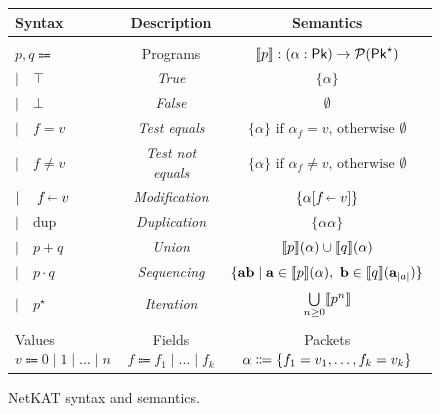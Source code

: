 \documentclass[acmsmall,dvipsnames,nonacm]{acmart}
\begin{document}
\begin{figure}
    \renewcommand{\arraystretch}{1.1}
    \begin{tabular}{lcc}
        \textbf{Syntax} & \textbf{Description} & \textbf{Semantics} \\[1mm]
        \hline \\[-0.9em]
        $p,q \Coloneqq $ & Programs & $\llbracket p \rrbracket : (\alpha : \mathsf{Pk}) \to \mathcal{P}(\mathsf{Pk}^\star)$ \\
        \qquad$\mid\quad \top$ & \emph{True} & $\{ \alpha \}$ \\
        \qquad$\mid\quad \bot$ & \emph{False} & $\emptyset$ \\
        \qquad$\mid\quad f = v$ & \emph{Test equals} & $\{ \alpha \} \text{ if } \alpha_f = v \text{, otherwise } \emptyset$ \\
        \qquad$\mid\quad f \neq v$ & \emph{Test not equals} & $\{ \alpha \} \text{ if } \alpha_f \neq v \text{, otherwise } \emptyset$ \\
        \qquad$\mid\quad f \mathrel{\!\shortleftarrow\!}\, v$ & \emph{Modification} & $\{ \alpha[f \mathrel{\!\shortleftarrow\!}\, v] \}$ \\
        \qquad$\mid\quad \text{dup}$ & \emph{Duplication} & $\{ \alpha\alpha \}$ \\
        \qquad$\mid\quad p + q$ & \emph{Union} & $\llbracket p \rrbracket(\alpha) \cup \llbracket q \rrbracket(\alpha)$ \\
        \qquad$\mid\quad p \cdot q$ & \emph{Sequencing} & $\{ \mathbf{a}\mathbf{b} \mid \mathbf{a} \in \llbracket p \rrbracket(\alpha),\ \mathbf{b} \in \llbracket q \rrbracket(\mathbf{a}_{|a|}) \}$ \\
        \qquad$\mid\quad p^\star$ & \emph{Iteration} & $\bigcup\limits_{n\geq 0} \llbracket p^n \rrbracket$ \\[3mm]
        \hline \\[-0.8em]
        {Values} $v \Coloneqq 0 \mid 1 \mid \ldots \mid n$ &
        {Fields} $f \Coloneqq f_1 \mid \ldots \mid f_k$ &
        {Packets} $\alpha \Coloneqq \{f_1 = v_1, \ldots, f_k = v_k\}$
    \end{tabular}
    \renewcommand{\arraystretch}{1.0}
    \caption{NetKAT syntax and semantics.}
    \label{fig:synsem}
\end{figure}
\end{document}
